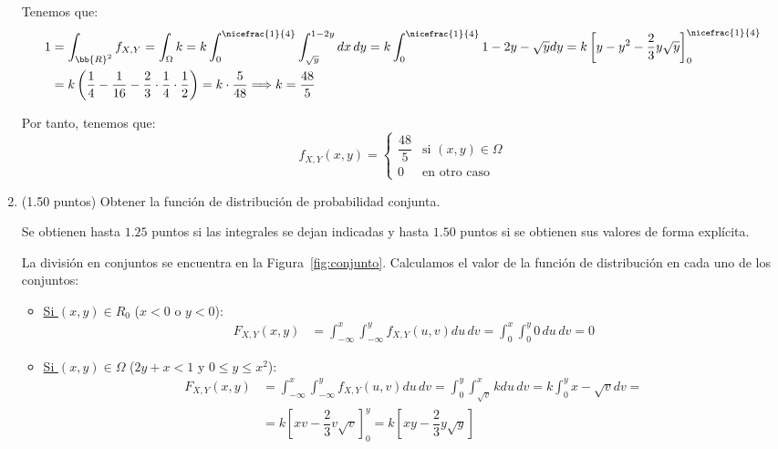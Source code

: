\documentclass[12pt]{article}
\begin{document}
\begin{ejercicio}[5 puntos]
\begin{enumerate}
            
            Tenemos que:
            \begin{align*}
                1&=\int_{\bb{R}^2} f_{X,Y}
                = \int_{\Omega} k
                = k\int_{0}^{\nicefrac{1}{4}}\int_{\sqrt{y}}^{1-2y}dx\,dy
                = k\int_{0}^{\nicefrac{1}{4}}1-2y-\sqrt{y}dy
                = k\left[y-y^2-\dfrac{2}{3}y\sqrt{y}\right]_{0}^{\nicefrac{1}{4}}\\
                &= k\left(\dfrac{1}{4}-\dfrac{1}{16}-\dfrac{2}{3}\cdot \dfrac{1}{4}\cdot \dfrac{1}{2}\right)
                = k\cdot \dfrac{5}{48}
                \Longrightarrow
                k=\dfrac{48}{5}
            \end{align*}

            Por tanto, tenemos que:
            \begin{equation*}
                f_{X,Y}(x,y) = \begin{cases}
                    \dfrac{48}{5} & \text{si } (x,y) \in \Omega\\
                    0 & \text{en otro caso}
                \end{cases}
            \end{equation*}
            \item (1.50 puntos) Obtener la función de distribución de probabilidad conjunta.
            \begin{observacion}
                Se obtienen hasta $1.25$ puntos si las integrales se dejan indicadas y hasta $1.50$ puntos si se obtienen sus valores de forma explícita.
            \end{observacion}
            
            La división en conjuntos se encuentra en la Figura~\ref{fig:conjunto}. Calculamos el valor de la función de distribución en cada uno de los conjuntos:
            \begin{itemize}
                \item \ul{Si $(x,y) \in R_0$} ($x<0$ o $y<0$):
                \begin{align*}
                    F_{X,Y}(x,y) &= \int_{-\infty}^x\int_{-\infty}^y f_{X,Y}(u,v)du\,dv
                    = \int_{0}^x\int_{0}^y 0\,du\,dv = 0
                \end{align*}

                \item \ul{Si $(x,y) \in \Omega$} ($2y+x<1$ y $0\leq y\leq x^2$):
                \begin{align*}
                    F_{X,Y}(x,y) &= \int_{-\infty}^x\int_{-\infty}^y f_{X,Y}(u,v)du\,dv
                    = \int_{0}^y \int_{\sqrt{v}}^x k du\,dv
                    = k\int_{0}^y x-\sqrt{v}dv
                    =\\&= k\left[xv-\dfrac{2}{3}v\sqrt{v}\right]_{0}^y
                    = k\left[xy-\dfrac{2}{3}y\sqrt{y}\right]
                \end{align*}


\end{itemize}
\end{enumerate}
\end{ejercicio}
\end{document}
